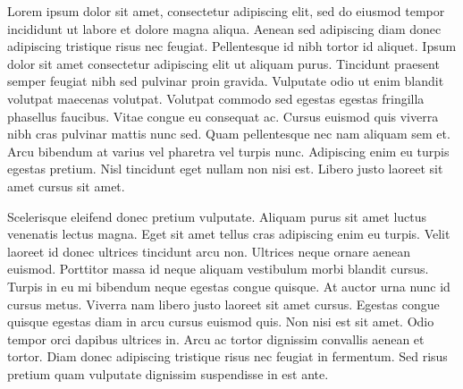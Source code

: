 Lorem ipsum dolor sit amet, consectetur adipiscing elit, sed do eiusmod tempor incididunt ut labore et dolore magna aliqua. Aenean sed adipiscing diam donec adipiscing tristique risus nec feugiat. Pellentesque id nibh tortor id aliquet. Ipsum dolor sit amet consectetur adipiscing elit ut aliquam purus. Tincidunt praesent semper feugiat nibh sed pulvinar proin gravida. Vulputate odio ut enim blandit volutpat maecenas volutpat. Volutpat commodo sed egestas egestas fringilla phasellus faucibus. Vitae congue eu consequat ac. Cursus euismod quis viverra nibh cras pulvinar mattis nunc sed. Quam pellentesque nec nam aliquam sem et. Arcu bibendum at varius vel pharetra vel turpis nunc. Adipiscing enim eu turpis egestas pretium. Nisl tincidunt eget nullam non nisi est. Libero justo laoreet sit amet cursus sit amet.

Scelerisque eleifend donec pretium vulputate. Aliquam purus sit amet luctus venenatis lectus magna. Eget sit amet tellus cras adipiscing enim eu turpis. Velit laoreet id donec ultrices tincidunt arcu non. Ultrices neque ornare aenean euismod. Porttitor massa id neque aliquam vestibulum morbi blandit cursus. Turpis in eu mi bibendum neque egestas congue quisque. At auctor urna nunc id cursus metus. Viverra nam libero justo laoreet sit amet cursus. Egestas congue quisque egestas diam in arcu cursus euismod quis. Non nisi est sit amet. Odio tempor orci dapibus ultrices in. Arcu ac tortor dignissim convallis aenean et tortor. Diam donec adipiscing tristique risus nec feugiat in fermentum. Sed risus pretium quam vulputate dignissim suspendisse in est ante.